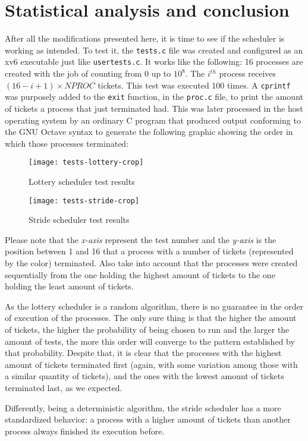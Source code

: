\documentclass[12pt]{article}
\begin{document}
\section{Statistical analysis and conclusion}
After all the modifications presented here, it is time to see if the scheduler is working as intended. To test it, the \texttt{tests.c} file was created and configured as an xv6 executable just like \texttt{usertests.c}. It works like the following: 16 processes are created with the job of counting from 0 up to $10^8$. The $i^{th}$ process receives $(16 - i + 1) \times NPROC$ tickets. This test was executed 100 times. A \texttt{cprintf} was purposely added to the \texttt{exit} function, in the \texttt{proc.c} file, to print the amount of tickets a process that just terminated had. This was later processed in the host operating system by an ordinary C program that produced output conforming to the GNU Octave syntax to generate the following graphic showing the order in which those processes terminated:

\begin{figure}[h]
\caption{Lottery scheduler test results}
\texttt{[image: tests-lottery-crop]}
\centering
\end{figure}

\begin{figure}[h]
\caption{Stride scheduler test results}
\texttt{[image: tests-stride-crop]}
\centering
\end{figure}

Please note that the \emph{x-axis} represent the test number and the \emph{y-axis} is the position between 1 and 16 that a process with a number of tickets (represented by the color) terminated. Also take into account that the processes were created sequentially from the one holding the highest amount of tickets to the one holding the least amount of tickets.

As the lottery scheduler is a random algorithm, there is no guarantee in the order of execution of the processes. The only sure thing is that the higher the amount of tickets, the higher the probability of being chosen to run and the larger the amount of tests, the more this order will converge to the pattern established by that probability. Despite that, it is clear that the processes with the highest amount of tickets terminated first (again, with some variation among those with a similar quantity of tickets), and the ones with the lowest amount of tickets terminated last, as we expected.

Differently, being a deterministic algorithm, the stride scheduler has a more standardized behavior: a process with a higher amount of tickets than another process always finished its execution before.



\end{document}
